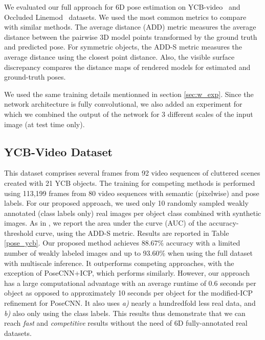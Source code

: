 \documentclass[letterpaper, 10 pt, conference]{ieeeconf}  %
\newcommand{\phil}[1]{\textcolor{blue}{#1}}
\begin{document}
We evaluated our full approach for 6D pose estimation on YCB-video~\cite{xiang2017posecnn} and Occluded Linemod~\cite{krull2015learning} datasets. We used the most common metrics to compare with similar methods. The average distance (ADD) metric \cite{hinterstoisser2012model} measures the average distance between the pairwise 3D model points transformed by the ground truth and predicted pose. For symmetric objects, the ADD-S metric measures the average distance using the closest point distance. Also, the visible surface discrepancy \cite{hodan2018bop} compares the distance maps of rendered models for estimated and ground-truth poses.

We used the same training details mentionned in section \ref{sec:w_exp}. Since the network architecture is fully convolutional, we also added an experiment for which we combined the output of the network for 3 different scales of the input image (at test time only).

\subsection{YCB-Video Dataset}%
This dataset comprises several frames from 92 video sequences of cluttered scenes created with 21 YCB objects. The training for competing methods \cite{xiang2017posecnn, oberweger2018making, drost2010model} is performed using 113,199 frames from 80 video sequences with semantic (pixelwise) and pose labels. For our proposed approach, we used only 10 randomly sampled weakly annotated (class labels only) real images per object class combined with synthetic images. As in \cite{xiang2017posecnn}, we report the area under the curve (AUC) of the accuracy-threshold curve, using the ADD-S metric.
Results are reported in Table \ref{pose_ycb}. Our proposed method achieves 88.67\% accuracy with a limited number of weakly labeled images and up to 93.60\% when using the full dataset with multiscale inference. It outperforms competing approaches, with the exception of PoseCNN+ICP, which performs similarly. However, our approach has a large computational advantage with an average runtime of 0.6 seconds per object as opposed to approximately 10 seconds per object for the modified-ICP refinement for PoseCNN. It also uses \emph{a)} nearly a hundredfold less real data, and \emph{b)} also only using the class labels. This results thus demonstrate that we can reach \emph{fast} and \emph{competitive} results without the need of 6D fully-annotated real datasets.
\end{document}
